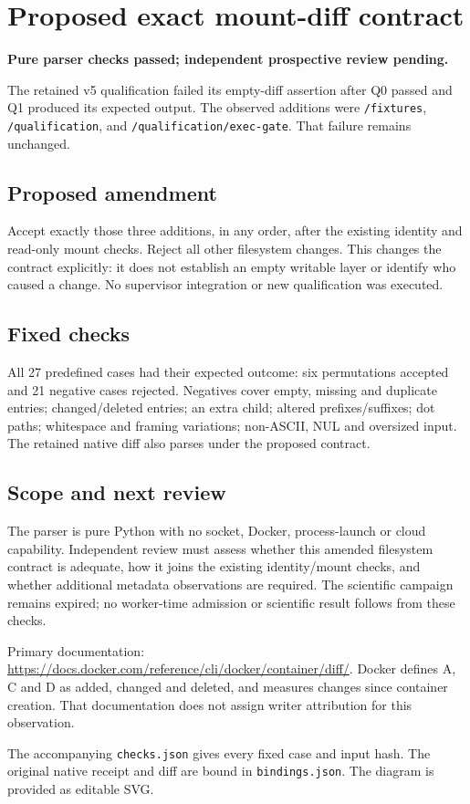 \documentclass[11pt]{article}
\begin{document}
\section*{Proposed exact mount-diff contract}
\textbf{Pure parser checks passed; independent prospective review pending.}

The retained v5 qualification failed its empty-diff assertion after Q0 passed and Q1 produced its expected output. The observed additions were \texttt{/fixtures}, \texttt{/qualification}, and \texttt{/qualification/exec-gate}. That failure remains unchanged.
\subsection*{Proposed amendment}
Accept exactly those three additions, in any order, after the existing identity and read-only mount checks. Reject all other filesystem changes. This changes the contract explicitly: it does not establish an empty writable layer or identify who caused a change. No supervisor integration or new qualification was executed.
\subsection*{Fixed checks}
All 27 predefined cases had their expected outcome: six permutations accepted and 21 negative cases rejected. Negatives cover empty, missing and duplicate entries; changed/deleted entries; an extra child; altered prefixes/suffixes; dot paths; whitespace and framing variations; non-ASCII, NUL and oversized input. The retained native diff also parses under the proposed contract.
\subsection*{Scope and next review}
The parser is pure Python with no socket, Docker, process-launch or cloud capability. Independent review must assess whether this amended filesystem contract is adequate, how it joins the existing identity/mount checks, and whether additional metadata observations are required. The scientific campaign remains expired; no worker-time admission or scientific result follows from these checks.

Primary documentation: \url{https://docs.docker.com/reference/cli/docker/container/diff/}. Docker defines A, C and D as added, changed and deleted, and measures changes since container creation. That documentation does not assign writer attribution for this observation.

The accompanying \texttt{checks.json} gives every fixed case and input hash. The original native receipt and diff are bound in \texttt{bindings.json}. The diagram is provided as editable SVG.
\end{document}
